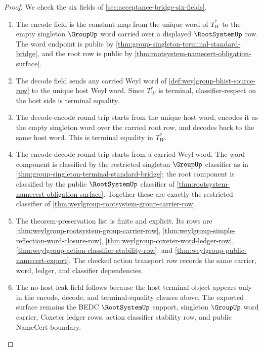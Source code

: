 \begin{proof}
We check the six fields of \autoref{sec:acceptance-bridge-six-fields}.
\begin{enumerate}
\item The encode field is the constant map from the unique word of
$T_W^\ast$ to the empty singleton $\GroupUp$ word carried over a displayed
$\RootSystemUp$ row. The word endpoint is public by
\autoref{thm:group-singleton-terminal-standard-bridge}, and the root row is
public by \autoref{thm:rootsystem-namecert-obligation-surface}.

\item The decode field sends any carried Weyl word of
\autoref{def:weylgroup-bhist-source-row} to the unique host Weyl word. Since
$T_W^\ast$ is terminal, classifier-respect on the host side is terminal
equality.

\item The decode-encode round trip starts from the unique host word, encodes
it as the empty singleton word over the carried root row, and decodes back to
the same host word. This is terminal equality in $T_W^\ast$.

\item The encode-decode round trip starts from a carried Weyl word. The word
component is classified by the restricted singleton $\GroupUp$ classifier as
in \autoref{thm:group-singleton-terminal-standard-bridge}; the root component
is classified by the public $\RootSystemUp$ classifier of
\autoref{thm:rootsystem-namecert-obligation-surface}. Together these are
exactly the restricted classifier of
\autoref{thm:weylgroup-rootsystem-group-carrier-row}.

\item The theorem-preservation list is finite and explicit. Its rows are
\autoref{thm:weylgroup-rootsystem-group-carrier-row},
\autoref{thm:weylgroup-simple-reflection-word-closure-row},
\autoref{thm:weylgroup-coxeter-word-ledger-row},
\autoref{thm:weylgroup-action-classifier-stability-row}, and
\autoref{thm:weylgroup-public-namecert-export}. The checked action transport
row records the same carrier, word, ledger, and classifier dependencies.

\item The no-host-leak field follows because the host terminal object appears
only in the encode, decode, and terminal-equality clauses above. The exported
surface remains the BEDC $\RootSystemUp$ support, singleton $\GroupUp$ word
carrier, Coxeter ledger rows, action classifier stability row, and public
NameCert boundary.
\end{enumerate}
\end{proof}

